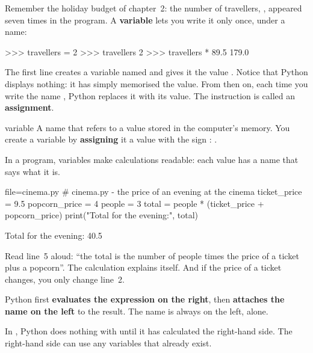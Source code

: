 Remember the holiday budget of chapter~2: the number of travellers, , appeared seven times in
the program. A \textbf{variable} lets you write it only once, under a name:

\begin{console}
>>> travellers = 2
>>> travellers
2
>>> travellers * 89.5
179.0
\end{console}

The first line creates a variable named  and gives it the value . Notice that
Python displays nothing: it has simply memorised the value. From then on, each time you write the
name , Python replaces it with its value. The instruction  is
called an \textbf{assignment}.

\begin{definition}{variable}
A name that refers to a value stored in the computer's memory. You create a variable by
\textbf{assigning} it a value with the sign \py{=}: .
\end{definition}

In a program, variables make calculations readable: each value has a name that says what it is.

\begin{code}{file=cinema.py}
# cinema.py - the price of an evening at the cinema
ticket_price = 9.5
popcorn_price = 4
people = 3
total = people * (ticket_price + popcorn_price)
print("Total for the evening:", total)
\end{code}
\begin{sortie}
Total for the evening: 40.5
\end{sortie}

Read line~5 aloud: \enquote{the total is the number of people times the price of a ticket plus a
popcorn}. The calculation explains itself. And if the price of a ticket changes, you only change line~2.

\begin{regle}
\quad Python first \textbf{evaluates the expression on the right}, then
\textbf{attaches the name on the left} to the result. The name is always on the left, alone.
\end{regle}


In , Python does nothing with  until
it has calculated the right-hand side. The right-hand side can use any variables that already exist.

